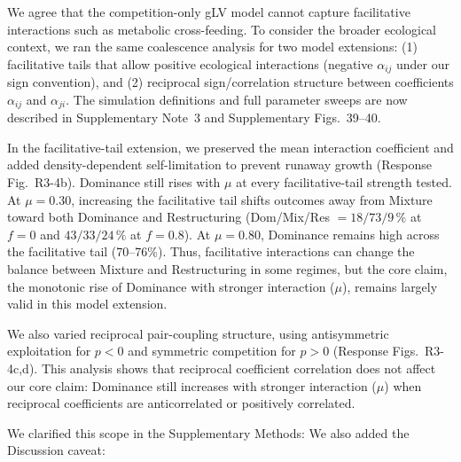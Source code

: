 We agree that the competition-only gLV model cannot capture facilitative interactions such as metabolic cross-feeding. To consider the broader ecological context, we ran the same coalescence analysis for two model extensions: (1) facilitative tails that allow positive ecological interactions (negative $\alpha_{ij}$ under our sign convention), and (2) reciprocal sign/correlation structure between coefficients $\alpha_{ij}$ and $\alpha_{ji}$. The simulation definitions and full parameter sweeps are now described in Supplementary Note~3 and Supplementary Figs.~39--40.

In the facilitative-tail extension, we preserved the mean interaction coefficient and added density-dependent self-limitation to prevent runaway growth (Response Fig.~R3-4b). Dominance still rises with $\mu$ at every facilitative-tail strength tested. At $\mu=0.30$, increasing the facilitative tail shifts outcomes away from Mixture toward both Dominance and Restructuring (Dom/Mix/Res $=18/73/9\,\%$ at $f=0$ and $43/33/24\,\%$ at $f=0.8$). At $\mu=0.80$, Dominance remains high across the facilitative tail (70--76\%). Thus, facilitative interactions can change the balance between Mixture and Restructuring in some regimes, but the core claim, the monotonic rise of Dominance with stronger interaction ($\mu$), remains largely valid in this model extension.

We also varied reciprocal pair-coupling structure, using antisymmetric exploitation for $p<0$ and symmetric competition for $p>0$ (Response Figs.~R3-4c,d). This analysis shows that reciprocal coefficient correlation does not affect our core claim: Dominance still increases with stronger interaction ($\mu$) when reciprocal coefficients are anticorrelated or positively correlated.

We clarified this scope in the Supplementary Methods:  We also added the Discussion caveat: 

